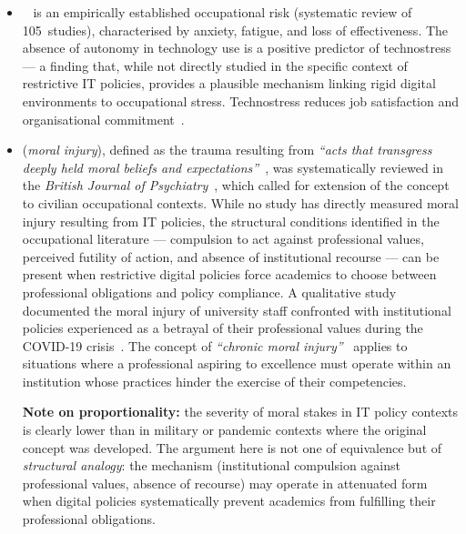 \begin{itemize}
    \item {}~\cite{brod1984, tarafdar2007,
    tarafdar2015, salanova2013, latorre2019} is an empirically
    established occupational risk (systematic review of 105~studies),
    characterised by anxiety, fatigue, and loss of effectiveness.
    The absence of autonomy in technology use is a positive predictor of
    technostress~\cite{salanova2013} --- a finding that, while not
    directly studied in the specific context of restrictive IT policies,
    provides a plausible mechanism linking rigid digital environments to
    occupational stress. Technostress reduces job satisfaction and
    organisational commitment~\cite{ragunathan2008}.

    \item {} (\emph{moral injury}), defined
    as the trauma resulting from \emph{``acts that transgress
    deeply held moral beliefs and
    expectations''}~\cite{litz2009}, was systematically reviewed
    in the \emph{British Journal of
    Psychiatry}~\cite{williamson2018}, which called for extension
    of the concept to civilian occupational contexts. While no study has directly
    measured moral injury resulting from IT policies, the structural
    conditions identified in the occupational literature --- compulsion to
    act against professional values, perceived futility of action, and
    absence of institutional recourse --- can be present when restrictive
    digital policies force academics to choose between professional
    obligations and policy compliance. A qualitative study
    documented the moral injury of university
    staff confronted with institutional policies
    experienced as a betrayal of their professional
    values during the COVID-19 crisis~\cite{hanna2023}. The concept of
    \emph{``chronic moral injury''}~\cite{abadal2022}
    applies to situations where a professional aspiring to
    excellence must operate within an institution whose
    practices hinder the exercise of their competencies.

\smallskip\noindent
\textbf{Note on proportionality:} the severity of moral stakes in IT
policy contexts is clearly lower than in military or pandemic contexts
where the original concept was developed. The argument here is not one
of equivalence but of \emph{structural analogy}: the mechanism
(institutional compulsion against professional values, absence of
recourse) may operate in attenuated form when digital policies
systematically prevent academics from fulfilling their professional
obligations.
\end{itemize}

